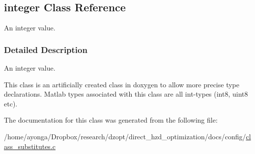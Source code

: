 \hypertarget{classinteger}{}\subsection{integer Class Reference}
\label{classinteger}


An integer value.  




\subsubsection{Detailed Description}
An integer value. 

This class is an artificially created class in doxygen to allow more precise type declarations. Matlab types associated with this class are all int-\/types (int8, uint8 etc). 

The documentation for this class was generated from the following file\+:\begin{DoxyCompactItemize}
\item 
/home/ayonga/\+Dropbox/research/dzopt/direct\+\_\+hzd\+\_\+optimization/docs/config/\hyperlink{class__substitutes_8c}{class\+\_\+substitutes.\+c}\end{DoxyCompactItemize}
